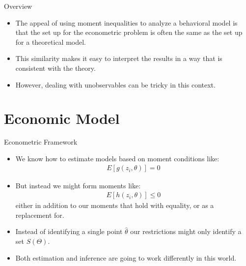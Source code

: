 \documentclass[xcolor=pdftex,dvipsnames,table,mathserif]{beamer}
\begin{document}
\begin{frame}{Overview}
\begin{itemize}
\item The appeal of using moment inequalities to analyze a behavioral model is
that the set up for the econometric problem is often the same as the set up for a
theoretical model.
\vspace{0.1in}
\item This similarity makes it easy to interpret the results in a way that
is consistent with the theory.
\vspace{0.1in}
\item However, dealing with unobservables can be tricky in this context.
\end{itemize}
\end{frame}

\section{Economic Model}

\begin{frame}{Econometric Framework}
\begin{itemize}
\item We know how to estimate models based on moment conditions like:
\begin{eqnarray*}
E[g(z_i, \theta)] = 0
\end{eqnarray*}
\item But instead we might form moments like:
\begin{eqnarray*}
E[h(z_i, \theta)] \leq 0
\end{eqnarray*}
either in addition to our moments that hold with equality, or as a replacement for.
\item Instead of identifying a single point $\hat{\theta}$ our restrictions might only \alert{identify a set} $S(\Theta)$.
\item Both estimation and inference are going to work differently in this world.
\end{itemize}
\end{frame}

\end{document}
